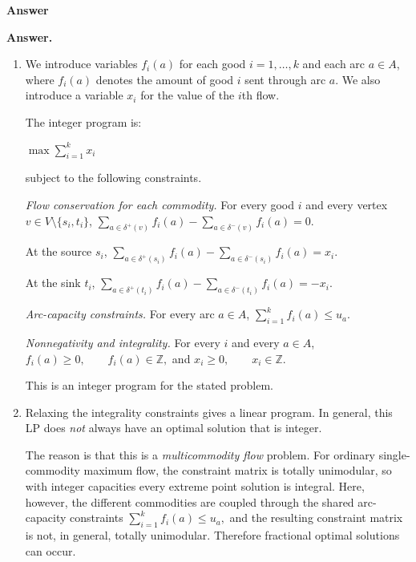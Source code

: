\documentclass[letterpaper]{article}
\begin{document}
		\textbf{Answer}
		
		\textbf{Answer.}
		
		\begin{enumerate}
			\item[(a)] We introduce variables $f_i(a)$ for each good $i=1,\ldots,k$ and each
			arc $a \in A$, where $f_i(a)$ denotes the amount of good $i$ sent through arc $a$.
			We also introduce a variable $x_i$ for the value of the $i$th flow.
			
			The integer program is:
			
			$
			\max \sum_{i=1}^k x_i
			$
			
			subject to the following constraints.
			
			\medskip
			
			\textit{Flow conservation for each commodity.} For every good $i$ and every
			vertex $v \in V \setminus \{s_i,t_i\}$,
			$
			\sum_{a \in \delta^+(v)} f_i(a) - \sum_{a \in \delta^-(v)} f_i(a) = 0.
			$
			
			At the source $s_i$,
			$
			\sum_{a \in \delta^+(s_i)} f_i(a) - \sum_{a \in \delta^-(s_i)} f_i(a) = x_i.
			$
			
			At the sink $t_i$,
			$
			\sum_{a \in \delta^+(t_i)} f_i(a) - \sum_{a \in \delta^-(t_i)} f_i(a) = -x_i.
			$
			
			\medskip
			
			\textit{Arc-capacity constraints.} For every arc $a \in A$,
			$
			\sum_{i=1}^k f_i(a) \le u_a.
			$
			
			\medskip
			
			\textit{Nonnegativity and integrality.} For every $i$ and every $a \in A$,
			$
			f_i(a) \ge 0, \qquad f_i(a) \in \mathbb{Z},
			$
			and
			$
			x_i \ge 0, \qquad x_i \in \mathbb{Z}.
			$
			
			This is an integer program for the stated problem.
			
			\medskip
			
			\item[(b)] Relaxing the integrality constraints gives a linear program. In general,
			this LP does \emph{not} always have an optimal solution that is integer.
			
			The reason is that this is a \emph{multicommodity flow} problem. For ordinary
			single-commodity maximum flow, the constraint matrix is totally unimodular, so
			with integer capacities every extreme point solution is integral. Here, however,
			the different commodities are coupled through the shared arc-capacity constraints
			$
			\sum_{i=1}^k f_i(a) \le u_a,
			$
			and the resulting constraint matrix is not, in general, totally unimodular.
			Therefore fractional optimal solutions can occur.
			

\end{enumerate}
\end{document}
